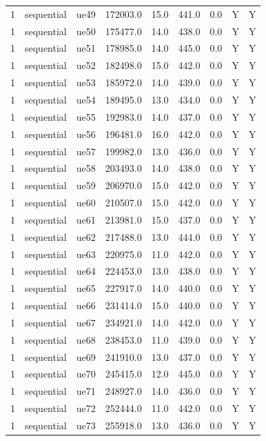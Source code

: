 \begin{table}[ht]
\begin{tabular}{|c|c|c|c|c|c|c|c|c|}
1 & sequential & ue49 & 172003.0 & 15.0 & 441.0 & 0.0 & Y & Y \\
1 & sequential & ue50 & 175477.0 & 14.0 & 438.0 & 0.0 & Y & Y \\
1 & sequential & ue51 & 178985.0 & 14.0 & 445.0 & 0.0 & Y & Y \\
1 & sequential & ue52 & 182498.0 & 15.0 & 442.0 & 0.0 & Y & Y \\
1 & sequential & ue53 & 185972.0 & 14.0 & 439.0 & 0.0 & Y & Y \\
1 & sequential & ue54 & 189495.0 & 13.0 & 434.0 & 0.0 & Y & Y \\
1 & sequential & ue55 & 192983.0 & 14.0 & 437.0 & 0.0 & Y & Y \\
1 & sequential & ue56 & 196481.0 & 16.0 & 442.0 & 0.0 & Y & Y \\
1 & sequential & ue57 & 199982.0 & 13.0 & 436.0 & 0.0 & Y & Y \\
1 & sequential & ue58 & 203493.0 & 14.0 & 438.0 & 0.0 & Y & Y \\
1 & sequential & ue59 & 206970.0 & 15.0 & 442.0 & 0.0 & Y & Y \\
1 & sequential & ue60 & 210507.0 & 15.0 & 442.0 & 0.0 & Y & Y \\
1 & sequential & ue61 & 213981.0 & 15.0 & 437.0 & 0.0 & Y & Y \\
1 & sequential & ue62 & 217488.0 & 13.0 & 444.0 & 0.0 & Y & Y \\
1 & sequential & ue63 & 220975.0 & 11.0 & 442.0 & 0.0 & Y & Y \\
1 & sequential & ue64 & 224453.0 & 13.0 & 438.0 & 0.0 & Y & Y \\
1 & sequential & ue65 & 227917.0 & 14.0 & 440.0 & 0.0 & Y & Y \\
1 & sequential & ue66 & 231414.0 & 15.0 & 440.0 & 0.0 & Y & Y \\
1 & sequential & ue67 & 234921.0 & 14.0 & 442.0 & 0.0 & Y & Y \\
1 & sequential & ue68 & 238453.0 & 11.0 & 439.0 & 0.0 & Y & Y \\
1 & sequential & ue69 & 241910.0 & 13.0 & 437.0 & 0.0 & Y & Y \\
1 & sequential & ue70 & 245415.0 & 12.0 & 445.0 & 0.0 & Y & Y \\
1 & sequential & ue71 & 248927.0 & 14.0 & 436.0 & 0.0 & Y & Y \\
1 & sequential & ue72 & 252444.0 & 11.0 & 442.0 & 0.0 & Y & Y \\
1 & sequential & ue73 & 255918.0 & 13.0 & 436.0 & 0.0 & Y & Y \\

\end{tabular}
\end{table}
